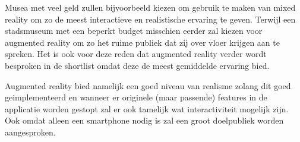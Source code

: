 Musea met veel geld zullen bijvoorbeeld kiezen om gebruik te maken van mixed reality om zo de meest interactieve en realistische ervaring te geven. Terwijl een stadsmuseum met een beperkt budget misschien eerder zal kiezen voor augmented reality om zo het ruime publiek dat zij over vloer krijgen aan te spreken. Het is ook voor deze reden dat augmented reality verder wordt besproken in de shortlist omdat deze de meest gemiddelde ervaring bied.

Augmented reality bied namelijk een goed niveau van realisme zolang dit goed geimplementeerd en wanneer er originele (maar passende) features in de applicatie worden gestopt zal er ook tamelijk wat interactiviteit mogelijk zijn. Ook omdat alleen een smartphone nodig is zal een groot doelpubliek worden aangesproken.